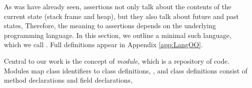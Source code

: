  
 
As was have already seen, \Chainmail assertions not only talk about the contents of the current state (stack frame and heap),
but they also talk about future and past states, Therefore, the meaning to \Chainmail assertions depends on the underlying programming
language. In this section, we outline a minimal such language, which we call  \LangOO. Full definitions appear in Appendix \ref{app:LangOO}. 

Central to our work is the concept of \emph{module}, which is a repository of code. Modules map class identifiers to class definitions, , and class definitions consist of method declarations and field declarations, 